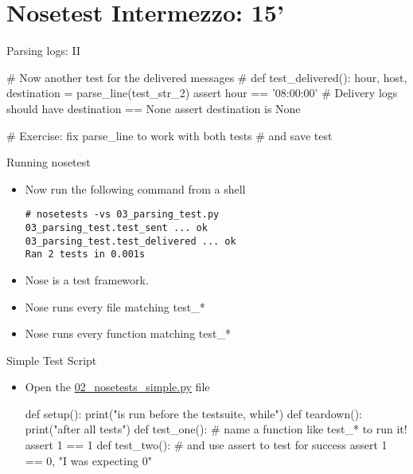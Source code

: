 \section{Nosetest Intermezzo: 15'}


\begin{pyframe}{Parsing logs: II}
\begin{pycode}
# Now another test for the delivered messages
#  %
def test_delivered():
    hour, host, destination = parse_line(test_str_2)
    assert hour == '08:00:00'
    # Delivery logs should have destination == None
    assert destination is None

# Exercise: fix parse_line to work with both tests
#  and save test
\end{pycode}
\end{pyframe}


\begin{pyframe}{Running nosetest}
\begin{itemize}
\item Now run the following command from a shell

\begin{verbatim}
# nosetests -vs 03_parsing_test.py
03_parsing_test.test_sent ... ok
03_parsing_test.test_delivered ... ok
Ran 2 tests in 0.001s
\end{verbatim}
\item Nose is a test framework.
\item Nose runs every file matching test\_*
\item Nose runs every function matching test\_*
\end{itemize}
\end{pyframe}

\begin{pyframe}{Simple Test Script}
\begin{itemize}
\item Open the \href{https://github.com/ioggstream/python-course/blob/master/python-for-sysadmin/02\_nosetests\_simple.py}{02\_nosetests\_simple.py} file
\begin{pycode}
def setup():
    print("is run before the testsuite, while")
def teardown():
    print("after all tests")
def test_one():
    # name a function like test_* to run it!
    assert 1 == 1
def test_two():
    # and use assert to test for success
    assert 1 == 0, "I was expecting 0"
\end{pycode}
\end{itemize}
\end{pyframe}

